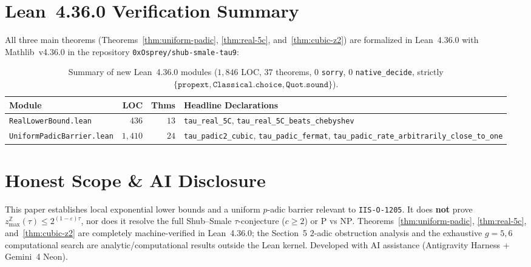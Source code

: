 \documentclass[11pt]{article}
\newcommand{\Z}{\mathbb{Z}}
\newcommand{\code}[1]{\texttt{#1}}
\newcommand{\zmax}{z_{\max}}
\begin{document}
\section{Lean~4.36.0 Verification Summary}

All three main theorems (Theorems~\ref{thm:uniform-padic}, \ref{thm:real-5c}, and~\ref{thm:cubic-z2}) are formalized in Lean~4.36.0 with Mathlib~v4.36.0 in the repository \code{0xOsprey/shub-smale-tau9}:

\begin{table}[h]
\centering
\footnotesize
\begin{tabularx}{\textwidth}{lrrX}
\toprule
Module & LOC & Thms & Headline Declarations \\
\midrule
\code{RealLowerBound.lean} & $436$ & $13$ & \code{tau\_real\_5C}, \code{tau\_real\_5C\_beats\_chebyshev} \\
\code{UniformPadicBarrier.lean} & $1{,}410$ & $24$ & \code{tau\_padic2\_cubic}, \code{tau\_padic\_fermat}, \code{tau\_padic\_rate\_}\allowbreak\code{arbitrarily\_close\_to\_one} \\
\bottomrule
\end{tabularx}
\caption{Summary of new Lean~4.36.0 modules ($1{,}846$ LOC, $37$ theorems, $0$ \code{sorry}, $0$ \code{native\_decide}, strictly $\{\code{propext}, \code{Classical.choice}, \code{Quot.sound}\}$).}
\end{table}

\section*{Honest Scope \& AI Disclosure}
This paper establishes local exponential lower bounds and a uniform $p$-adic barrier relevant to \code{IIS-O-1205}. It does \textbf{not} prove $\zmax^{\Z}(\tau) \le 2^{(1-\varepsilon)\tau}$, nor does it resolve the full Shub--Smale $\tau$-conjecture ($c \ge 2$) or $\mathrm{P}$ vs $\mathrm{NP}$. Theorems~\ref{thm:uniform-padic}, \ref{thm:real-5c}, and~\ref{thm:cubic-z2} are completely machine-verified in Lean~4.36.0; the Section~5 $2$-adic obstruction analysis and the exhaustive $g = 5, 6$ computational search are analytic/computational results outside the Lean kernel. Developed with AI assistance (Antigravity Harness + Gemini~4 Neon).
\end{document}
